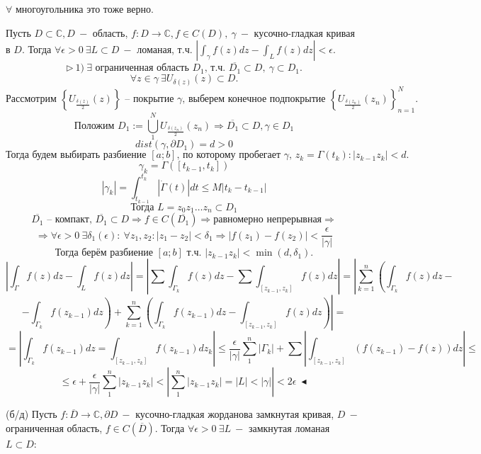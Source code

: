  $\forall$ многоугольника это тоже верно.

 Пусть $D \subset \mathbb{C}, D \ -$ область, $f:D \to \mathbb{C}, f \in C(D), \ \gamma \ -$ кусочно-гладкая кривая в $D$. Тогда $\forall \epsilon > 0 \ \exists L \subset D \ - $ ломаная, т.ч. $\left|\int_\gamma f(z) dz - \int_L f(z) dz\right| < \epsilon$.
\[\triangleright \ 1) \ \exists \text { ограниченная область $D_1$, т.ч. } \overline{D_1} \subset D, \ \gamma \subset D_1.\]
\[\forall z \in \gamma \ \exists U_{\delta(z)}(z) \subset D.\] 
\[\text{Рассмотрим } \left\{U_{\frac{\delta(z)}{2}}(z)\right\} \text{ -- покрытие $\gamma$, выберем конечное подпокрытие } \left\{U_{\frac{\delta(z_n)}{2}}(z_n)\right\}_{n=1}^N.\]
\[\text{Положим } D_1 := \bigcup_1^N U_{\frac{\delta(z_n)}{2}}(z_n) \Rightarrow \overline{D_1} \subset D, \gamma \in D_1\]
\[dist (\gamma, \partial D_1) = d > 0\]
\[\text{Тогда будем выбирать разбиение $[a;b]$, по которому пробегает $\gamma$, $z_k = \Gamma(t_k) : |z_{k-1} z_k| < d$.} \]
\[\gamma_k = \Gamma([t_{k-1}, t_k])\]
\[|\gamma_k| = \int_{t_{k-1}}^{t_k} |\dot{\Gamma}(t)| dt \leq M |t_k-t_{k-1}|\]
\[\text{Тогда } L = z_0z_1\ldots z_n \subset D_1\]
\[\overline{D_1} \text{ -- компакт, } \overline{D_1} \subset D \Rightarrow f \in C(\overline{D_1}) \Rightarrow \text{равномерно непрерывная} \Rightarrow\]
\[\Rightarrow \forall \epsilon > 0 \ \exists \delta_1(\epsilon): \ \forall z_1, z_2 : |z_1-z_2| < \delta_1 \Rightarrow |f(z_1)-f(z_2)| < \frac{\epsilon}{|\gamma|}\]
\[\text{Тогда берём разбиение $[a; b]$ т.ч. $|z_{k-1}z_k| < \min(d, \delta_1)$.}\]
\[\left|\int_\Gamma f(z) dz - \int_L f(z) dz\right| = \left|\sum \int_{\Gamma_k}f(z) dz - \sum \int_{[z_{k-1},z_k]}f(z)dz\right| = \left|\sum_{k=1}^n \left(\int_{\Gamma_k}f(z) dz -\right.\right.\] 
\[- \left.\left.\int_{\Gamma_k}f(z_{k-1}) dz \right) + \sum_{k=1}^n \left(\int_{\Gamma_k}f(z_{k-1}) dz - \int_{[z_{k-1},z_k]}f(z) dz\right)\right| =\] 
\[= \left|\int_{\Gamma_k} f(z_{k-1})dz =\int_{[z_{k-1}, z_k]} f(z_{k-1})dz_k \right| \leq \frac{\epsilon}{|\gamma|} \sum_1^n |\Gamma_k| + \sum \left|\int_{[z_{k-1}, z_k]}(f(z_{k-1}) - f(z))dz\right| \leq\]
\[\leq \epsilon + \frac{\epsilon}{|\gamma|} \sum_1^n |z_{k-1}z_k| < \left|\sum_1^n |z_{k-1}z_k| = |L| < |\gamma|\right| < 2\epsilon \ \blacktriangleleft\]

 (б/д) Пусть $f:\overline{D} \to \mathbb{C}, \partial D \ - $ кусочно-гладкая жорданова замкнутая кривая, $D \ -$ ограниченная область, $f \in C(\overline{D})$. Тогда $\forall \epsilon > 0 \ \exists L \ -$ замкнутая ломаная $L \subset D:$ 

